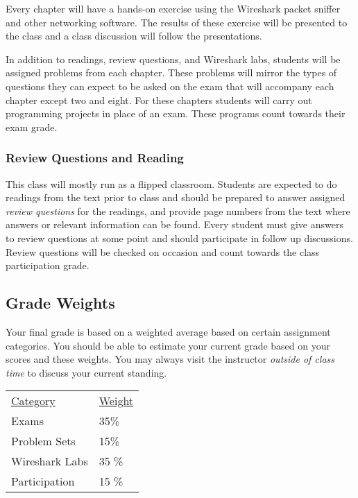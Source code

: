 \documentclass[10pt]{article}
\begin{document}
Every chapter will have a hands-on exercise using the Wireshark packet sniffer and other networking software. The results of these exercise will be presented to the class and
a class discussion will follow the presentations.

In addition to readings, review questions, and Wireshark labs, students will be assigned problems from each chapter. These problems will mirror the types of questions they can expect to be asked on the exam that will accompany each chapter except two and eight. For these chapters students will carry out programming projects in place of an exam. These programs count towards their exam grade.


\subsubsection{Review Questions and Reading}

This class will mostly run as a flipped classroom. Students are expected to do readings from the text prior to class and should be prepared to answer assigned \textit{review questions} for the readings, and provide page numbers from the text where answers or relevant information can be found. Every student must give answers to review questions at some point and should participate in follow up discussions. Review questions will be checked on occasion and count towards the class participation grade.

\subsection{Grade Weights}

Your final grade is based on a weighted average based on certain  assignment categories.  You should be able to estimate your current grade based on your scores and these weights.  You may always visit the instructor \textit{outside of class time} to discuss your current standing.

\begin{center}
  \begin{tabular}{ll}
  \underline{Category} & \underline{Weight} \\
    Exams & 35\% \\ %
    Problem Sets &  15\% \\ %
    Wireshark Labs & 35 \% \\ %
    Participation & 15 \%
  \end{tabular}
\end{center}
\end{document}
